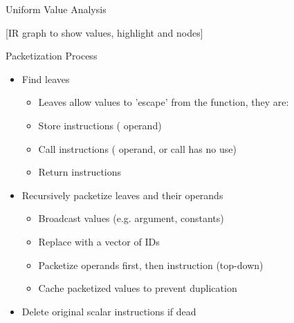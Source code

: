 
\begin{frame}[c]{Uniform Value Analysis}

[IR graph to show values, highlight  and  nodes]

\end{frame}


\begin{frame}{Packetization Process}

\begin{itemize}
    \item Find leaves
    \begin{itemize}
        \item Leaves allow  values to 'escape' from the function, they are:
        \item Store instructions ( operand)
        \item Call instructions ( operand, or call has no use)
        \item Return instructions
    \end{itemize}
\end{itemize}

\begin{itemize}
    \item Recursively packetize leaves and their operands
    \begin{itemize}
        \item Broadcast  values (e.g. argument, constants)
        \item Replace  with a vector of IDs
        \item Packetize operands first, then instruction (top-down)
        \item Cache packetized values to prevent duplication
    \end{itemize}
\end{itemize}

\begin{itemize}
    \item Delete original scalar instructions if dead
\end{itemize}

\end{frame}

